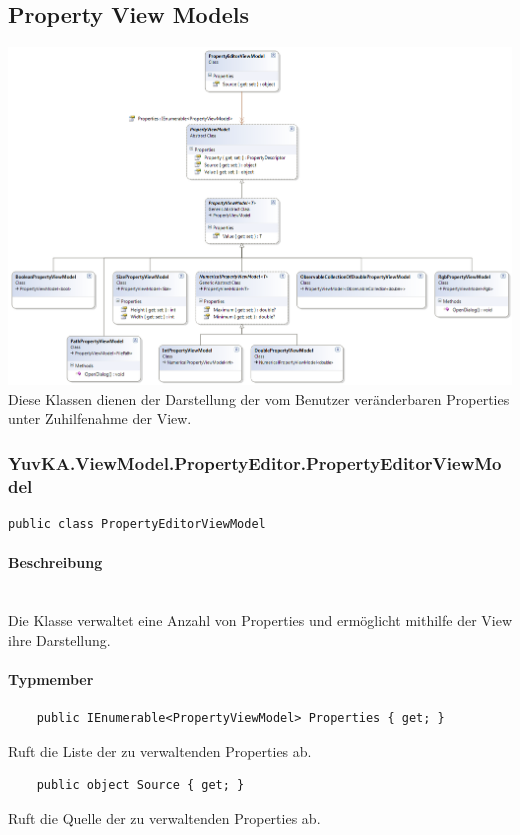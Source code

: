 \subsection{Property View Models}


\includegraphics[width=\textwidth]{YuvKA.ViewModel.PropertyEditor/propertyEditor.png}
Diese Klassen dienen der Darstellung der vom Benutzer veränderbaren Properties unter Zuhilfenahme der View. 



\subsubsection{YuvKA.ViewModel.PropertyEditor.PropertyEditorViewModel}

\begin{verbatim}
public class PropertyEditorViewModel
\end{verbatim}

\paragraph{Beschreibung}~\\
Die Klasse  verwaltet eine Anzahl von Properties und ermöglicht mithilfe der View ihre Darstellung.

\paragraph{Typmember}
\begin{itemize}

	\begin{verbatim}
	public IEnumerable<PropertyViewModel> Properties { get; }
	\end{verbatim}
	Ruft die Liste der zu verwaltenden Properties ab.

	\begin{verbatim}
	public object Source { get; }
	\end{verbatim}
	Ruft die Quelle der zu verwaltenden Properties ab.

\end{itemize}




